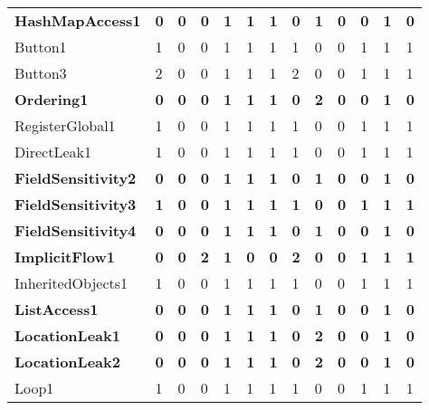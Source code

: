 \begin{table*}[b]
\begin{small}
\begin{center}
{\begin{tabular}{|l||C{1.4cm}|C{1.4cm}|C{1.4cm}|C{1.4cm}|C{1.4cm}|C{1.4cm}||C{1.4cm}|C{1.4cm}|C{1.4cm}|C{1.4cm}|C{1.4cm}|C{1.4cm}|}
{\bf HashMapAccess1          }&{\bf  0  }&{\bf  0  }&{\bf  0  }&{\bf  1  }&{\bf  1  }&{\bf  1  }&{\bf  0  }&{\bf  1  }&{\bf  0  }&{\bf  0  }&{\bf  1  }&{\bf  0  }\\
Button1                 &  1  &  0  &  0  &  1  &  1  &  1  &  1  &  0  &  0  &  1  &  1  &  1  \\
Button3                 &  2  &  0  &  0  &  1  &  1  &  1  &  2  &  0  &  0  &  1  &  1  &  1  \\
{\bf Ordering1               }&{\bf  0  }&{\bf  0  }&{\bf  0  }&{\bf  1  }&{\bf  1  }&{\bf  1  }&{\bf  0  }&{\bf  2  }&{\bf  0  }&{\bf  0  }&{\bf  1  }&{\bf  0  }\\
RegisterGlobal1         &  1  &  0  &  0  &  1  &  1  &  1  &  1  &  0  &  0  &  1  &  1  &  1  \\
DirectLeak1             &  1  &  0  &  0  &  1  &  1  &  1  &  1  &  0  &  0  &  1  &  1  &  1  \\
{\bf FieldSensitivity2       }&{\bf  0  }&{\bf  0  }&{\bf  0  }&{\bf  1  }&{\bf  1  }&{\bf  1  }&{\bf  0  }&{\bf  1  }&{\bf  0  }&{\bf  0  }&{\bf  1  }&{\bf  0  }\\
{\bf FieldSensitivity3       }&{\bf  1  }&{\bf  0  }&{\bf  0  }&{\bf  1  }&{\bf  1  }&{\bf  1  }&{\bf  1  }&{\bf  0  }&{\bf  0  }&{\bf  1  }&{\bf  1  }&{\bf  1  }\\
{\bf FieldSensitivity4       }&{\bf  0  }&{\bf  0  }&{\bf  0  }&{\bf  1  }&{\bf  1  }&{\bf  1  }&{\bf  0  }&{\bf  1  }&{\bf  0  }&{\bf  0  }&{\bf  1  }&{\bf  0  }\\
{\bf ImplicitFlow1           }&{\bf  0  }&{\bf  0  }&{\bf  2  }&{\bf  1  }&{\bf  0  }&{\bf  0  }&{\bf  2  }&{\bf  0  }&{\bf  0  }&{\bf  1  }&{\bf  1  }&{\bf  1  }\\
InheritedObjects1       &  1  &  0  &  0  &  1  &  1  &  1  &  1  &  0  &  0  &  1  &  1  &  1  \\
{\bf ListAccess1             }&{\bf  0  }&{\bf  0  }&{\bf  0  }&{\bf  1  }&{\bf  1  }&{\bf  1  }&{\bf  0  }&{\bf  1  }&{\bf  0  }&{\bf  0  }&{\bf  1  }&{\bf  0  }\\
{\bf LocationLeak1           }&{\bf  0  }&{\bf  0  }&{\bf  0  }&{\bf  1  }&{\bf  1  }&{\bf  1  }&{\bf  0  }&{\bf  2  }&{\bf  0  }&{\bf  0  }&{\bf  1  }&{\bf  0  }\\
{\bf LocationLeak2           }&{\bf  0  }&{\bf  0  }&{\bf  0  }&{\bf  1  }&{\bf  1  }&{\bf  1  }&{\bf  0  }&{\bf  2  }&{\bf  0  }&{\bf  0  }&{\bf  1  }&{\bf  0  }\\
Loop1                   &  1  &  0  &  0  &  1  &  1  &  1  &  1  &  0  &  0  &  1  &  1  &  1  \\

\end{tabular}}
\end{center}
\end{small}
\end{table*}
